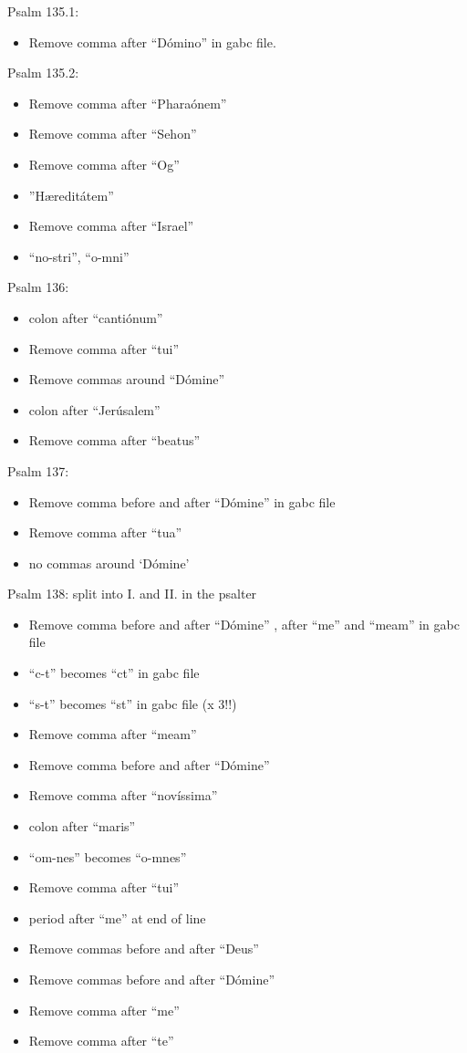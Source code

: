 \documentclass[11pt]{article}
\begin{document}
Psalm 135.1:
  \begin{itemize}
  \item Remove comma after ``Dómino'' in gabc file.
    \end{itemize}

Psalm 135.2:
  \begin{itemize}
  \item Remove comma after ``Pharaónem''
  \item  Remove comma after ``Sehon''
   \item Remove comma after ``Og''
   \item ''Hæreditátem''
     \item Remove comma after ``Israel''
     \item
     ``no-stri'', ``o-mni''
    \end{itemize}

Psalm 136:
  \begin{itemize}
  \item colon after ``cantiónum''
    \item  Remove comma after ``tui''
    \item
    Remove commas around ``Dómine''
  \item  colon after ``Jerúsalem''
  \item
  Remove comma after ``beatus''
    \end{itemize}

      Psalm 137:
  \begin{itemize}
  \item Remove comma before and after ``Dómine'' in gabc file
  \item  Remove comma after ``tua''
  \item
  no commas around `Dómine'
    \end{itemize}

      Psalm 138: split into I. and II. in the psalter
  \begin{itemize}
    \item Remove comma before and after ``Dómine'' , after ``me'' and ``meam'' in gabc file
    \item
    ``c-t'' becomes ``ct'' in gabc file
       \item
    ``s-t'' becomes ``st'' in gabc file (x 3!!)
    \item
    Remove comma after ``meam''
  \item Remove comma before and after ``Dómine'' 
  \item  Remove comma after ``novíssima''
  \item
  colon after ``maris''
  \item
   ``om-nes'' becomes  ``o-mnes''
  \item Remove comma after ``tui''
    \item
period after ``me'' at end of line
  \item
  
  Remove commas before and after ``Deus''
  \item   Remove commas before and after ``Dómine''
  \item Remove comma after ``me''
   \item Remove comma after ``te''
  
    \end{itemize}
\end{document}
